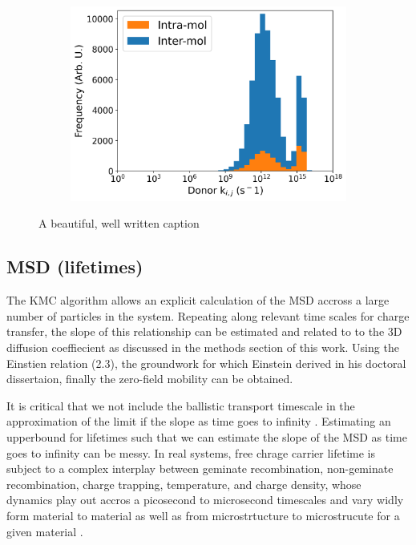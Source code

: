 \begin{figure}[]
\begin{subfigure}{.5\textwidth}
    \includegraphics[width=\textwidth]{figures/donor_hopping_rate_clusters_temp800.png}
\end{subfigure}
\caption[short]{A beautiful, well written caption}
\label{TEMP}
\end{figure}

\subsection{MSD (lifetimes)}

The KMC algorithm allows an explicit calculation of the MSD accross a large number of 
particles in the system. Repeating along relevant time scales for 
charge transfer, the slope of this relationship
can be estimated and related to to the 3D diffusion coeffiecient as discussed in the methods section of this
work. Using the Einstien relation (2.3), 
the groundwork for which Einstein derived in his doctoral dissertaion, finally the zero-field
mobility can be obtained. 

It is critical that we not include the ballistic transport timescale in the approximation of the limit
if the slope as time goes to infinity \cite{Maginn2018}. Estimating an upperbound for lifetimes such that
we can estimate the slope of the MSD as time goes to infinity can be messy. In real systems, free chrage
carrier lifetime is subject to a complex interplay between geminate recombination, non-geminate recombination,
charge trapping, temperature, and charge density, whose dynamics play out accros a picosecond to microsecond
timescales and vary widly form material to material as well as from microstrtucture to microstrucute for a
given material \cite{Laquai2015}.

